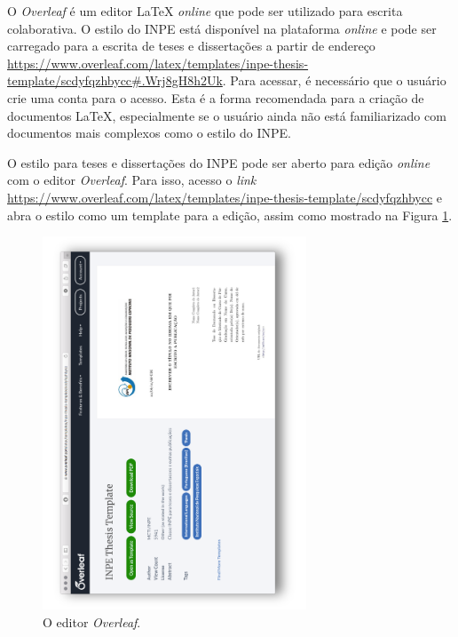 O \textit{Overleaf} é um editor \LaTeX{} \textit{online} que pode ser utilizado para escrita colaborativa. O estilo do INPE está disponível na plataforma \textit{online} e pode ser carregado para a escrita de teses e dissertações a partir de endereço \url{https://www.overleaf.com/latex/templates/inpe-thesis-template/scdyfqzhbycc#.Wrj8gH8h2Uk}. Para acessar, é necessário que o usuário crie uma conta para o acesso. Esta é a forma recomendada para a criação de documentos \LaTeX{}, especialmente se o usuário ainda não está familiarizado com documentos mais complexos como o estilo do INPE. 

O estilo para teses e dissertações do INPE pode ser aberto para edição \textit{online} com o editor \textit{Overleaf}. Para isso, acesso o \textit{link} \url{https://www.overleaf.com/latex/templates/inpe-thesis-template/scdyfqzhbycc} e abra o estilo como um template para a edição, assim como mostrado na Figura \ref{fig:overleaf1}.

\begin{figure}[H]
\caption{O editor \textit{Overleaf}.}
\vspace{6mm}
  \begin{center}
    \includegraphics[width=0.7\textwidth,angle=-90]{./docs/figs/overleaf1.pdf}
  \end{center}
\vspace{4mm}
\label{fig:overleaf1}
\end{figure}

